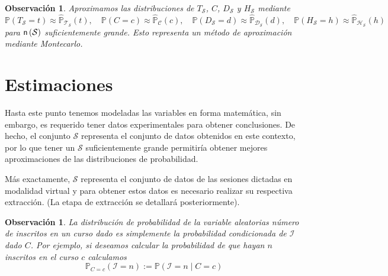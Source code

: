 \documentclass[11pt,a4paper]{book}
\newtheorem{observacion}[teorema]{Observaci\'on}
\theoremstyle{definition}%
\newcommand{\Probsymb}{\mathds{P}}
\newcommand{\Prob}[1]{\mathds{P}\left( #1 \right)}
\newcommand{\card}[1]{\text{\textsf{n}}\left( #1 \right)}
\begin{document}
            \begin{observacion}
                Aproximamos las distribuciones de $T_\mathcal{S}$, $C$, $ D_\mathcal{S}$ y $H_\mathcal{S}$ mediante
                \begin{equation}\label{Otras variables aleatorias Montecarlo}
                    \Prob{T_\mathcal{S}=t}\approx \hat{\Probsymb}_{\mathcal{T}_\mathcal{S}}(t),\quad \Prob{C=c}\approx \hat{\Probsymb}_\mathcal{C}(c), \quad \Prob{D_\mathcal{S}=d}\approx \hat{\Probsymb}_{\mathcal{D}_\mathcal{S}}(d),\quad \Prob{H_\mathcal{S}=h}\approx \hat{\Probsymb}_{\mathcal{H}_\mathcal{S}}(h)
                \end{equation}
                para $\card{\mathcal{S}}$ suficientemente grande. Esto representa un método de aproximación mediante Montecarlo.
            \end{observacion}
        \section{Estimaciones}
            Hasta este punto tenemos modeladas las variables en forma matemática, sin embargo, es requerido tener datos experimentales para obtener conclusiones. De hecho, el conjunto $\mathcal{S}$ representa el conjunto de datos obtenidos en este contexto, por lo que tener un $\mathcal{S}$ suficientemente grande permitiría obtener mejores aproximaciones de las distribuciones de probabilidad.

            Más exactamente, $\mathcal{S}$ representa el conjunto de datos de las sesiones dictadas en modalidad virtual y para obtener estos datos es necesario realizar su respectiva extracción. (La etapa de extracción se detallará posteriormente).

            \begin{observacion}\label{obs prob cond}
                La distribución de probabilidad de la variable aleatorias número de inscritos en un curso dado es simplemente la probabilidad condicionada de $\mathcal{I}$ dado $C$. Por ejemplo, si deseamos calcular la probabilidad de que hayan $n$ inscritos en el curso $c$ calculamos
                \begin{equation*}
                    \Probsymb_{C=c}(\mathcal{I}=n):=\Prob{\mathcal{I}=n\mid C = c}
                \end{equation*}
            \end{observacion}
\end{document}
